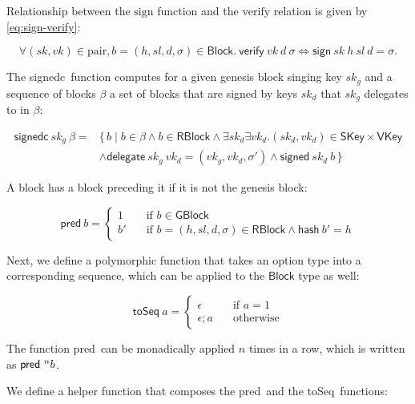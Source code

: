 \documentclass[11pt,a4paper]{article}
\newcommand\Set[2]{\{\,#1\mid#2\,\}}
\newcommand{\fun}[1]{\mathsf{#1}}
\newcommand{\type}[1]{\mathsf{#1}}
\newcommand{\GBlock}{\type{GBlock}}
\newcommand{\RBlock}{\type{RBlock}}
\newcommand{\Block}{\type{Block}}
\newcommand{\SKey}{\type{SKey}}
\newcommand{\VKey}{\type{VKey}}
\newcommand{\hashname}{hash}
\newcommand{\signname}{sign}
\newcommand{\signedname}{signed}
\newcommand{\signedseqname}{signedc}
\newcommand{\verifyname}{verify}
\newcommand{\delegatename}{delegate}
\newcommand{\keypairname}{pair}
\newcommand{\predbname}{pred} %
\newcommand{\toseqname}{toSeq} %
\newcommand{\sign}[4]{\fun{\signname}\ #1 ~ #2 ~ #3 ~ #4}
\newcommand{\signed}[2]{\fun{\signedname}\ #1 ~ #2}
\newcommand{\signedwindow}[2]{\fun{\signedseqname}\ #1 ~ #2}
\newcommand{\verify}[3]{\fun{\verifyname} ~ #1 ~ #2 ~ #3}
\newcommand{\hash}[1]{\fun{\hashname}\ #1}
\newcommand{\delegate}[2]{\fun{\delegatename}\ #1 ~ #2}
\newcommand{\predb}[1]{\fun{\predbname} ~ #1}
\newcommand{\toseq}[1]{\fun{\toseqname} ~ #1}
\begin{document}
Relationship between the $\text{\signname}$ function and the
$\text{\verifyname}$ relation is given by \eqref{eq:sign-verify}:

\begin{equation}
  \label{eq:sign-verify}
  \forall (sk, vk) \in \text{\keypairname}, b = (h, sl, d, \sigma) \in \Block.\
  \verify{vk}{d}{\sigma} \iff \sign{sk}{h}{sl}{d} = \sigma.
\end{equation}

The \signedseqname\ function computes for a given genesis block singing key $sk_g$ and a sequence of blocks $\beta$ a set of blocks that are signed by keys $sk_d$ that $sk_g$ delegates to in $\beta$:

\begin{align}
  \label{eq:signed-window}
  \signedwindow{sk_g}{\beta} = & \Set{b}{b \in \beta \wedge b \in \RBlock \wedge \exists sk_d \exists vk_d. (sk_d, vk_d) \in \SKey \times \VKey \\
  & \wedge \delegate{sk_g}{vk_d} = (vk_g, vk_d, \sigma') \wedge \signed{sk_d}{b}}
\end{align}

A block has a block preceding it if it is not the genesis block:

\begin{equation}
  \label{eq:predb}
  \predb{b} =
  \begin{cases}
    1 & \quad \text{if } b \in \GBlock \\
    b' & \quad \text{if } b = (h, sl, d, \sigma) \in \RBlock \wedge \hash{b'} = h
  \end{cases}
\end{equation}

Next, we define a polymorphic function that takes an option type into a
corresponding sequence, which can be applied to the $\Block$ type as well:

\begin{equation}
  \label{eq:toseq}
  \toseq{a} =
  \begin{cases}
    \epsilon & \quad \text{if } a = 1 \\
    \epsilon; a & \quad \text{otherwise}
  \end{cases}
\end{equation}

The function \predbname\ can be monadically applied $n$ times in a row, which
is written as $\predb^n{b}$.

We define a helper function that composes the \predbname\ and the \toseqname\
functions:
\end{document}
